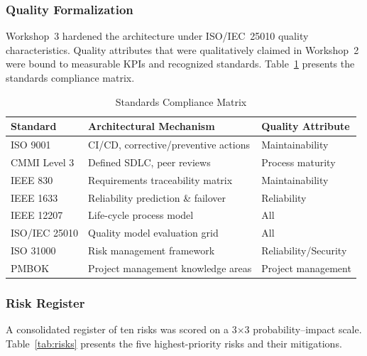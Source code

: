 \documentclass[11pt,a4paper]{article}
\begin{document}
\subsubsection{Quality Formalization}

Workshop~3 hardened the architecture under ISO/IEC~25010 quality characteristics. Quality attributes that were qualitatively claimed in Workshop~2 were bound to measurable KPIs and recognized standards. Table~\ref{tab:standards} presents the standards compliance matrix.

\begin{table}[H]
\centering
\caption{Standards Compliance Matrix}
\label{tab:standards}
\small
\begin{tabularx}{\textwidth}{l X l}
\toprule
\textbf{Standard} & \textbf{Architectural Mechanism} & \textbf{Quality Attribute} \\
\midrule
ISO 9001 & CI/CD, corrective/preventive actions & Maintainability \\
CMMI Level 3 & Defined SDLC, peer reviews & Process maturity \\
IEEE 830 & Requirements traceability matrix & Maintainability \\
IEEE 1633 & Reliability prediction \& failover & Reliability \\
IEEE 12207 & Life-cycle process model & All \\
ISO/IEC 25010 & Quality model evaluation grid & All \\
ISO 31000 & Risk management framework & Reliability/Security \\
PMBOK & Project management knowledge areas & Project management \\
\bottomrule
\end{tabularx}
\end{table}

\subsubsection{Risk Register}

A consolidated register of ten risks was scored on a 3$\times$3 probability--impact scale. Table~\ref{tab:risks} presents the five highest-priority risks and their mitigations.
\end{document}
